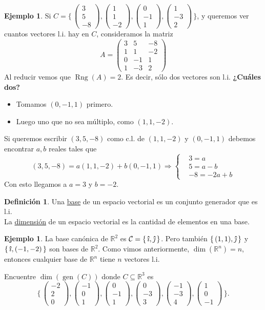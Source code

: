 \documentclass[12pt]{article}
\theoremstyle{plain}
\theoremstyle{definition}
\newtheorem*{Def}{Definición}       %
\newtheorem{Ex}[Th]{Ejemplo}           %
\theoremstyle{remark}
\DeclareMathOperator{\gen}{gen}     %
\DeclareMathOperator{\Rng}{Rng}     %
\newcommand{\ii}{\vu{\imath}}
\newcommand{\jj}{\vu{\jmath}}
\newcommand{\bR}{\mathbb{R}}        %
\newcommand{\cC}{\mathcal{C}}       %
\renewcommand{\:}{\colon}           %
\newcommand{\un}[1]{\underline{#1}}
\renewcommand{\.}{\Cdot}                %
\newcommand{\threebyone}[3]{\begin{pmatrix} %
  #1 \\ #2 \\ #3 \end{pmatrix}}
\newcommand{\To}{\Rightarrow}
\newcommand{\set}[1]{\{\,#1\,\}}    %
\newcommand{\Set}[1]{\biggl\{\,#1\,\biggr\}} %
\begin{document}
\begin{multicols}{2}
\begin{Ex}
Si $C=\Set{\threebyone{3}{5}{-8},\threebyone{1}{1}{-2},\threebyone{0}{-1}{1},\threebyone{1}{-3}{2}}$, y queremos ver cuantos vectores l.i. hay en $C$, consideramos la matriz
  $$A=\begin{pmatrix}
    3&5&-8\\1&1&-2\\ 0&-1&1\\ 1&-3&2
  \end{pmatrix}$$
  Al reducir vemos que $\Rng(A)=2$. Es decir, sólo dos vectores son l.i. \textbf{¿Cuáles dos?} \begin{itemize}
    \itemsep=-0.4em
    \item Tomamos $(0,-1,1)$ primero.
    \item Luego uno que no sea múltiplo, como $(1,1,-2)$.
  \end{itemize}
  Si queremos escribir $(3,5,-8)$ como c.l. de $(1,1,-2)$ y $(0,-1,1)$ debemos encontrar $a,b$ reales tales que 
  $$(3,5,-8)=a(1,1,-2)+b(0,-1,1)\To\left\lbrace\begin{aligned}
    &3=a\\
    &5=a-b\\
    &-8=-2a+b
  \end{aligned}\right.$$
  Con esto llegamos a $a=3$ y $b=-2$.
\end{Ex}

\begin{Def}
  Una \un{base} de un espacio vectorial es un conjunto generador que es l.i.\\
  La \un{dimensión} de un espacio vectorial es la cantidad de elementos en una base.
\end{Def}

\begin{Ex}
  La base canónica de $\bR^2$ es $\cC=\set{\ii,\jj}$. Pero también $\set{(1,1),\jj}$ y $\set{\ii,(-1,-2)}$ son bases de $\bR^2$. Como vimos anteriormente, $\dim(\bR^n)=n$, entonces cualquier base de $\bR^n$ tiene $n$ vectores l.i.
\end{Ex}
\begin{ptcbP}
Encuentre $\dim(\gen(C))$ donde $C\subseteq\bR^3$ es
$$\Set{\threebyone{-2}{2}{0},\threebyone{-1}{0}{1},\threebyone{0}{-1}{1},\threebyone{0}{-3}{3},\threebyone{-1}{-3}{4},\threebyone{1}{0}{-1}}.$$
\end{ptcbP}
\end{multicols}
\end{document}
